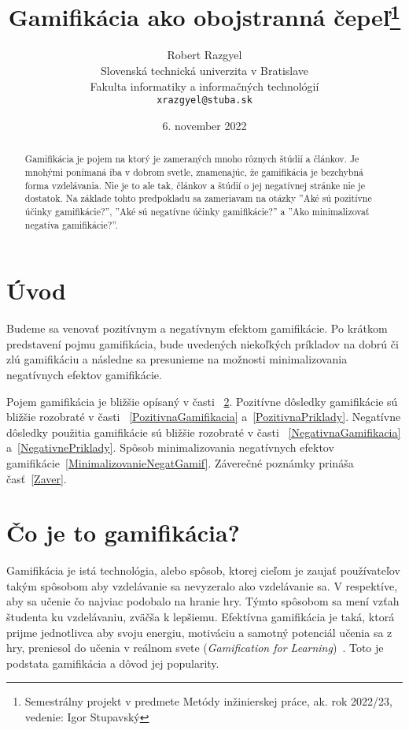 \documentclass[10pt,oneside,slovak,a4paper]{article}
\title{Gamifikácia ako obojstranná čepeľ\thanks{Semestrálny projekt v predmete Metódy inžinierskej práce, ak. rok 2022/23, vedenie: Igor Stupavský}}
\author{Robert Razgyel\\[2pt]
	{\small Slovenská technická univerzita v Bratislave}\\
	{\small Fakulta informatiky a informačných technológií}\\
	{\small \texttt{xrazgyel@stuba.sk}}
	}
\date{\small 6. november 2022} %
\begin{document}
\maketitle

\begin{abstract}
Gamifikácia je pojem na ktorý je zameraných mnoho rôznych štúdií a článkov. Je mnohými ponímaná iba v dobrom svetle, znamenajúc, že gamifikácia je bezchybná forma vzdelávania. Nie je to ale tak, článkov a štúdií o jej negatívnej stránke nie je dostatok. Na základe tohto predpokladu sa zameriavam na otázky ''Aké sú pozitívne účinky gamifikácie?'', ''Aké sú negatívne účinky gamifikácie?'' a ''Ako minimalizovať negatíva gamifikácie?''. 
\end{abstract}



\section{Úvod}

Budeme sa venovať pozitívnym a negatívnym efektom gamifikácie. Po krátkom predstavení pojmu gamifikácia, bude uvedených niekoľkých príkladov na dobrú či zlú gamifikáciu a následne sa presunieme na možnosti minimalizovania negatívnych efektov gamifikácie.

Pojem gamifikácia je bližšie opísaný v časti ~\ref{CoJeGamifikacia}.
Pozitívne dôsledky gamifikácie sú bližšie rozobraté v časti ~\ref{PozitivnaGamifikacia} a~\ref{PozitivnaPriklady}.
Negatívne dôsledky použitia gamifikácie sú bližšie rozobraté v časti ~\ref{NegativnaGamifikacia} a~\ref{NegativnePriklady}.
Spôsob minimalizovania negatívnych efektov gamifikácie~\ref{MinimalizovanieNegatGamif}.
Záverečné poznámky prináša časť~\ref{Zaver}.

\section{Čo je to gamifikácia?} \label{CoJeGamifikacia}

Gamifikácia je istá technológia, alebo spôsob, ktorej cieľom je zaujať používateľov takým spôsobom aby vzdelávanie sa nevyzeralo ako vzdelávanie sa. V respektíve, aby sa učenie čo najviac podobalo na hranie hry. Týmto spôsobom sa mení vzťah študenta ku vzdelávaniu, zväčša k lepšiemu. Efektívna gamifikácia je taká, ktorá prijme jednotlivca aby svoju energiu, motiváciu a samotný potenciál učenia sa z hry, preniesol do učenia v reálnom svete (\emph{Gamification for Learning})~\cite{10.1007/978-3-319-97934-2_9}. Toto je podstata gamifikácia a dôvod jej popularity.
\end{document}
